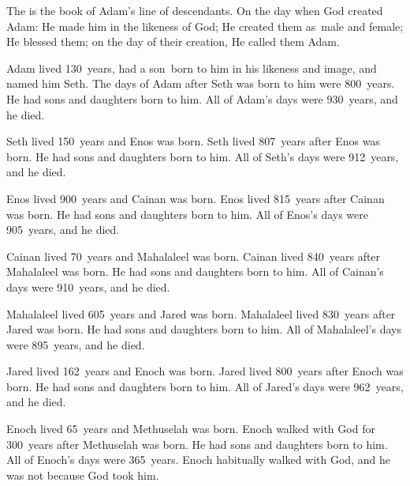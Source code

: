 
\begin{inparaenum}
   The is the book of Adam's line of descendants. On the day when God created Adam: He made him in the likeness of God;%
   He created them as\understood{}\ male and female; He blessed them; on the day of their creation, He called them Adam.%

   Adam lived 130~years, had a son\understood{}\ born to him in his likeness and image, and named him Seth.%
   The days of Adam after Seth was born to him were 800~years. He had sons and daughters born to him.%
   All of Adam's days were 930~years, and he died.%

   Seth lived 150~years and Enos was born.%
   Seth lived 807~years after Enos was born. He had sons and daughters born to him.%
   All of Seth's days were 912~years, and he died.%

   Enos lived 900~years and Cainan was born.%
   Enos lived 815~years after Cainan was born. He had sons and daughters born to him.%
   All of Enos's days were 905~years, and he died.%

   Cainan lived 70~years and Mahalaleel was born.%
   Cainan lived 840~years after Mahalaleel was born. He had sons and daughters born to him.%
   All of Cainan's days were 910~years, and he died.%

   Mahalaleel lived 605~years and Jared was born.%
   Mahalaleel lived 830~years after Jared was born. He had sons and daughters born to him.%
   All of Mahalaleel's days were 895~years, and he died.%

   Jared lived 162~years and Enoch was born.%
   Jared lived 800~years after Enoch was born. He had sons and daughters born to him.%
   All of Jared's days were 962~years, and he died.%

   Enoch lived 65~years and Methuselah was born.%
   Enoch walked with God for 300~years after Methuselah was born. He had sons and daughters born to him.%
   All of Enoch's days were 365~years.%
   Enoch habitually walked with God, and he was not because God took him.%


\end{inparaenum}
